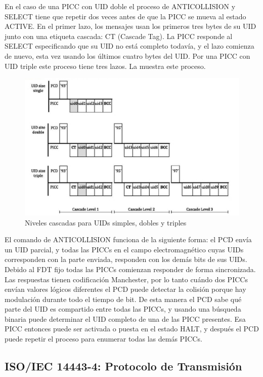 \documentclass[a4paper, twoside, 11pt]{report}
\begin{document}
En el caso de una PICC con UID doble el proceso de ANTICOLLISION y SELECT tiene que repetir dos veces antes de que la PICC se mueva al estado ACTIVE. En el primer lazo, los mensajes usan los primeros tres bytes de su UID junto con una etiqueta cascada: CT (Cascade Tag). La PICC responde al SELECT especificando que su UID no está completo todavía, y el lazo comienza de nuevo, esta vez usando los últimos cuatro bytes del UID. Por una PICC con UID triple este proceso tiene tres lazos. La  muestra este proceso.

\begin{figure}[htb]
  \centering
  \includegraphics[scale=0.75]{./img/cascade_levels}
  \caption{Niveles cascadas para UIDs simples, dobles y triples~\cite{iso14443-3}}
  \label{fig:cascade_levels}
\end{figure}

El comando de ANTICOLLISION funciona de la siguiente forma: el PCD envía un UID parcial, y todas las PICCs en el campo electromagnético cuyas UIDs corresponden con la parte enviada, responden con los demás bits de sus UIDs. Debido al FDT fijo todas las PICCs comienzan responder de forma sincronizada. Las respuestas tienen codificación Manchester, por lo tanto cuándo dos PICCs envían valores lógicos diferentes el PCD puede detectar la colisión porque hay modulación durante todo el tiempo de bit. De esta manera el PCD sabe qué parte del UID es compartido entre todas las PICCs, y usando una búsqueda binaria puede determinar el UID completo de una de las PICC presentes. Esa PICC entonces puede ser activada o puesta en el estado HALT, y después el PCD puede repetir el proceso para enumerar todas las demás PICCs.

\FloatBarrier
\subsection{ISO/IEC 14443-4: \large{Protocolo de Transmisión}}
\end{document}
